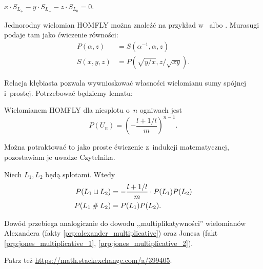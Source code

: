 \begin{definition}
    $x \cdot S_{L_+} - y \cdot S_{L_-} - z \cdot S_{L_0} = 0$.
\end{definition}

Jednorodny wielomian HOMFLY można znaleźć na przykład w~\cite[s. 10]{millett1988} albo \cite[s. 231]{murasugi1996}.
Murasugi podaje tam jako ćwiczenie równości:
%
\begin{align}
    P(\alpha, z) & = S(\alpha^{-1}, \alpha, z) \\
    S(x, y, z) & = P(\sqrt{y/x}, z/\sqrt{xy}).
\end{align}

Relacja kłębiasta pozwala wywnioskować własności wielomianu sumy spójnej i~prostej.
Potrzebować będziemy lematu:

\begin{lemma}
\label{lem:homfly_unlinks}%
    Wielomianem HOMFLY dla niesplotu o~$n$ ogniwach jest
    \begin{equation}
        P(U_n) = \left(-\frac{l+1/l}{m}\right)^{n-1}.
    \end{equation}
\end{lemma}

Można potraktować to jako proste ćwiczenie z~indukcji matematycznej, pozostawiam je uwadze Czytelnika.

\begin{proposition}
    \label{prp:homfly_and_shraps}%
    Niech $L_1, L_2$ będą splotami.
    Wtedy
    \begin{align}
        P(L_1 \sqcup L_2) & = - \frac{l + 1/l}{m} \cdot P(L_1) P(L_2) \\
        P(L_1 \mathbin{\#} L_2) & = P(L_1) P(L_2).
    \end{align}
\end{proposition}

Dowód przebiega analogicznie do dowodu ,,multiplikatywności'' wielomianów Alexandera (fakty \ref{prp:alexander_multiplicative}) oraz Jonesa (fakt \ref{prp:jones_multiplicative_1}, \ref{prp:jones_multiplicative_2}).

Patrz też \url{https://math.stackexchange.com/a/399405}.

